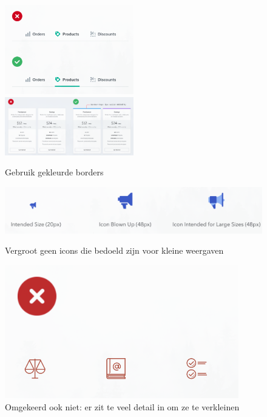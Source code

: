 \documentclass{article}
\begin{document}
\begin{figure}[H]
    \centering
    \includegraphics[width=0.5\textwidth]{img/Screenshot_20200302_093650.png}
    \includegraphics[width=0.5\textwidth]{img/Screenshot_20200302_093708.png}
    \caption{Gebruik gekleurde borders}
\end{figure}

\begin{figure}[H]
    \centering
    \includegraphics[width=\textwidth]{img/Screenshot_20200302_093831.png}
    \caption{Vergroot geen icons die bedoeld zijn voor kleine weergaven}
    \includegraphics{img/Screenshot_20200302_093924.png}
    \caption{Omgekeerd ook niet: er zit te veel detail in om ze te verkleinen}

\end{figure}
\end{document}
